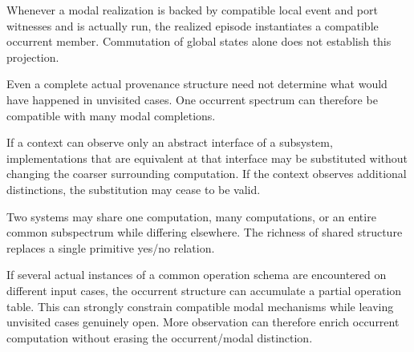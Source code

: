 \documentclass[11pt,a4paper]{article}
\begin{document}
\begin{consequencebox}[title={7. Modal realization projects to occurrent realization}]
Whenever a modal realization is backed by compatible local event and port witnesses and is actually run, the realized episode instantiates a compatible occurrent member. Commutation of global states alone does not establish this projection.
\end{consequencebox}

\begin{consequencebox}[title={8. Occurrent realization underdetermines modal realization}]
Even a complete actual provenance structure need not determine what would have happened in unvisited cases. One occurrent spectrum can therefore be compatible with many modal completions.
\end{consequencebox}

\begin{consequencebox}[title={9. Local substitution is controlled by interface}]
If a context can observe only an abstract interface of a subsystem, implementations that are equivalent at that interface may be substituted without changing the coarser surrounding computation. If the context observes additional distinctions, the substitution may cease to be valid.
\end{consequencebox}

\begin{consequencebox}[title={10. ``Same computation'' is naturally many-valued in structure, not vague in truth}]
Two systems may share one computation, many computations, or an entire common subspectrum while differing elsewhere. The richness of shared structure replaces a single primitive yes/no relation.
\end{consequencebox}

\begin{consequencebox}[title={11. Occurrent repetition can reveal partial laws without becoming modal}]
If several actual instances of a common operation schema are encountered on different input cases, the occurrent structure can accumulate a partial operation table. This can strongly constrain compatible modal mechanisms while leaving unvisited cases genuinely open. More observation can therefore enrich occurrent computation without erasing the occurrent/modal distinction.
\end{consequencebox}
\end{document}
